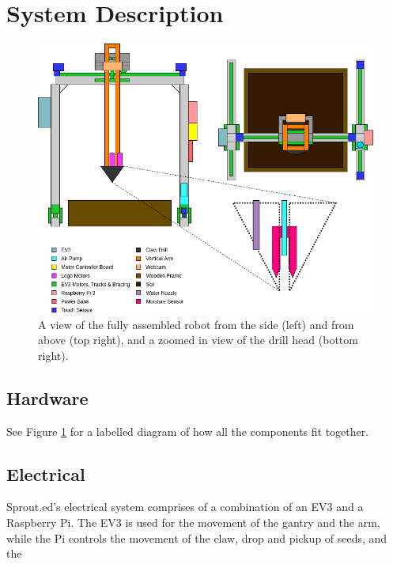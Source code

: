 \documentclass{article}
\begin{document}
\section{System Description}\label{sec:description}

\begin{figure}[h]
    \centering
    \includegraphics[width=1\linewidth]{figs-userguide/diagram.png}
    \caption{A view of the fully assembled robot from the side (left) and from above (top right), and a zoomed in view of the drill head (bottom right).}
    \label{fig:the-robot}
\end{figure}

\subsection{Hardware}
See Figure \ref{fig:the-robot} for a labelled diagram of how all the components fit together.

\subsection{Electrical}
Sprout.ed's electrical system comprises of a combination of an EV3 and a Raspberry Pi. The EV3 is used for the movement of the gantry and the arm, while the Pi controls the movement of the claw, drop and pickup of seeds, and the 
\end{document}
